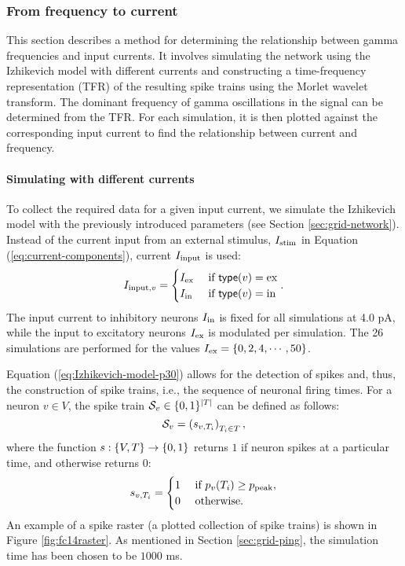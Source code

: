 \subsubsection{From frequency to current}

This section describes a method for determining the relationship between gamma frequencies and input currents. It involves simulating the network using the Izhikevich model with different currents and constructing a time-frequency representation (TFR) of the resulting spike trains using the Morlet wavelet transform. The dominant frequency of gamma oscillations in the signal can be determined from the TFR. For each simulation, it is then plotted against the corresponding input current to find the relationship between current and frequency.

\paragraph{Simulating with different currents}

To collect the required data for a given input current, we simulate the Izhikevich model with the previously introduced parameters (see Section \ref{sec:grid-network}). Instead of the current input from an external stimulus, $I_{\mathrm{stim}}$ in Equation (\ref{eq:current-components}), current $I_{\mathrm{input}}$ is used:
\begin{equation}
    I_{\mathrm{input}, v} = \begin{cases}
        I_{\mathrm{ex}} & \text{ if } \mathsf{type}(v) = \mathrm{ex} \\
        I_{\mathrm{in}} & \text{ if } \mathsf{type}(v) = \mathrm{in}
    \end{cases}.
\end{equation}
The input current to inhibitory neurons $I_{\mathrm{in}}$ is fixed for all simulations at 4.0 pA, while the input to excitatory neurons $I_{\mathrm{ex}}$ is modulated per simulation. The 26 simulations are performed for the values $I_{\mathrm{ex}} = \{ 0, 2, 4, \cdots, 50 \}$.

Equation (\ref{eq:Izhikevich-model-p30}) allows for the detection of spikes and, thus, the construction of spike trains, i.e., the sequence of neuronal firing times. For a neuron $v \in V$, the spike train $\mathcal{S}_v \in \{0, 1\}^{|T|}$ can be defined as follows:
\begin{equation}
    \mathcal{S}_v = 
    \left( 
        s_{v, T_i}
    \right)_{T_i \in T},
\end{equation}
where the function $s: \{V, T\} \to \{0, 1\}$ returns $1$ if neuron spikes at a particular time, and otherwise returns $0$:
\begin{equation}
    s_{v, T_i} = \begin{cases}
        1 &\text{ if } p_v(T_i) \geq p_{\mathrm{peak}}
        , \\
        0 &\text{ otherwise}.
    \end{cases}
\end{equation}
An example of a spike raster (a plotted collection of spike trains) is shown in Figure \ref{fig:fc14raster}. As mentioned in Section \ref{sec:grid-ping}, the simulation time has been chosen to be $1000$ ms.

